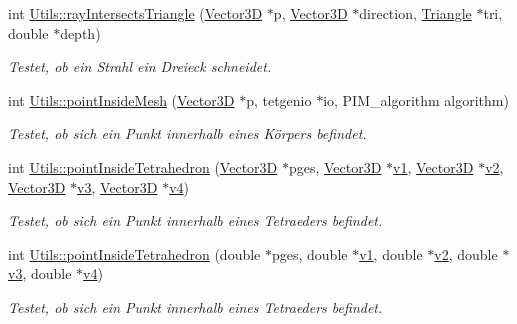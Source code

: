 \begin{DoxyCompactItemize}
int \hyperlink{namespaceUtils_a5f216cc7011a901130db81321b565334}{Utils\-::ray\-Intersects\-Triangle} (\hyperlink{classVector3D}{Vector3\-D} $\ast$p, \hyperlink{classVector3D}{Vector3\-D} $\ast$direction, \hyperlink{classTriangle}{Triangle} $\ast$tri, double $\ast$depth)
\begin{DoxyCompactList}\small\item\em Testet, ob ein Strahl ein Dreieck schneidet. \end{DoxyCompactList}\item 
int \hyperlink{namespaceUtils_af8fc5d6dab27f759ab5d76757a53023f}{Utils\-::point\-Inside\-Mesh} (\hyperlink{classVector3D}{Vector3\-D} $\ast$p, tetgenio $\ast$io, P\-I\-M\-\_\-algorithm algorithm)
\begin{DoxyCompactList}\small\item\em Testet, ob sich ein Punkt innerhalb eines Körpers befindet. \end{DoxyCompactList}\item 
int \hyperlink{namespaceUtils_a9b995a1220a78be108b19bda4b776332}{Utils\-::point\-Inside\-Tetrahedron} (\hyperlink{classVector3D}{Vector3\-D} $\ast$pges, \hyperlink{classVector3D}{Vector3\-D} $\ast$\hyperlink{particle__sim_2ParticleSystem_8h_a8d89db3c6515289b4df99467371c544f}{v1}, \hyperlink{classVector3D}{Vector3\-D} $\ast$\hyperlink{particle__sim_2ParticleSystem_8h_aadda57ca88b1f7b495ff17bc402bb584}{v2}, \hyperlink{classVector3D}{Vector3\-D} $\ast$\hyperlink{particle__sim_2ParticleSystem_8h_ac3e04ab93bb7f4e1e62ac7311bf75293}{v3}, \hyperlink{classVector3D}{Vector3\-D} $\ast$\hyperlink{particle__sim_2ParticleSystem_8h_a601d75fa74098fd47a857d5afddb6830}{v4})
\begin{DoxyCompactList}\small\item\em Testet, ob sich ein Punkt innerhalb eines Tetraeders befindet. \end{DoxyCompactList}\item 
int \hyperlink{namespaceUtils_a8f7379e1915d2a04907eb9d99d0a56ad}{Utils\-::point\-Inside\-Tetrahedron} (double $\ast$pges, double $\ast$\hyperlink{particle__sim_2ParticleSystem_8h_a8d89db3c6515289b4df99467371c544f}{v1}, double $\ast$\hyperlink{particle__sim_2ParticleSystem_8h_aadda57ca88b1f7b495ff17bc402bb584}{v2}, double $\ast$\hyperlink{particle__sim_2ParticleSystem_8h_ac3e04ab93bb7f4e1e62ac7311bf75293}{v3}, double $\ast$\hyperlink{particle__sim_2ParticleSystem_8h_a601d75fa74098fd47a857d5afddb6830}{v4})
\begin{DoxyCompactList}\small\item\em Testet, ob sich ein Punkt innerhalb eines Tetraeders befindet. \end{DoxyCompactList}\item 

\end{DoxyCompactItemize}

